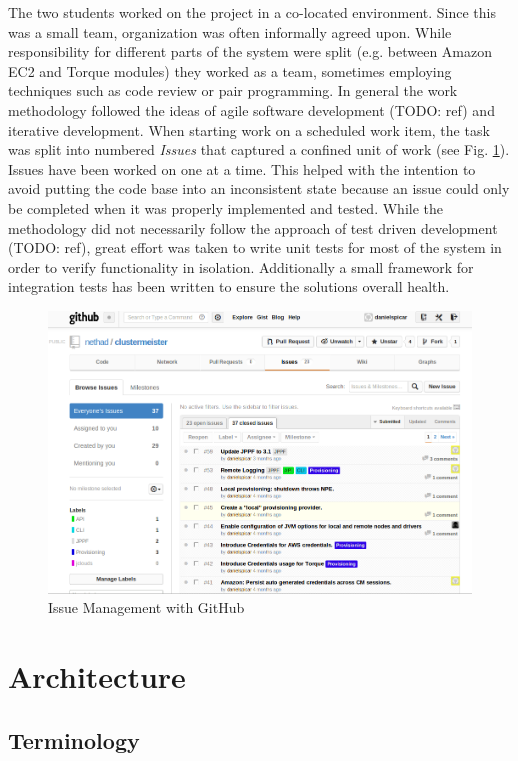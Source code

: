 \documentclass{article}
\begin{document}
The two students worked on the project in a co-located environment. Since this was a small team, organization was often informally agreed upon. While responsibility for different parts of the system were split (e.g. between Amazon EC2 and Torque modules) they worked as a team, sometimes employing techniques such as code review or pair programming. In general the work methodology followed the ideas of agile software development (TODO: ref) and iterative development. When starting work on a scheduled work item, the task was split into numbered \emph{Issues} that captured a confined unit of work (see Fig. \ref{fig:issues}). Issues have been worked on one at a time. This helped with the intention to avoid putting the code base into an inconsistent state because an issue could only be completed when it was properly implemented and tested. While the methodology did not necessarily follow the approach of test driven development (TODO: ref), great effort was taken to write unit tests for most of the system in order to verify functionality in isolation. Additionally a small framework for integration tests has been written to ensure the solutions overall health.

\begin{figure}[hptb]
\centering
\includegraphics[scale=0.4]{issue-management.png}
\caption{Issue Management with GitHub}
\label{fig:issues}
\end{figure}

\section{Architecture}
\label{architecture}

\subsection{Terminology}
\end{document}
